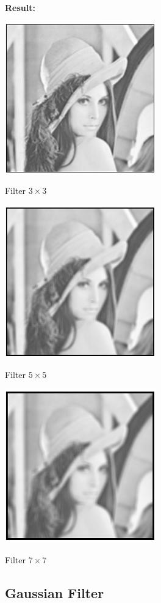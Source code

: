\documentclass[10pt]{article}
\begin{document}
\textbf{Result:}

\begin{center}
	\includegraphics{a3x3.png}
	
	Filter $3\times3$
	
	 \includegraphics{a5x5.png}
	
	Filter $5\times5$
	
		\includegraphics{a7x7.png}
	
Filter $7\times7$
\end{center}

\subsection{Gaussian Filter}
\end{document}
